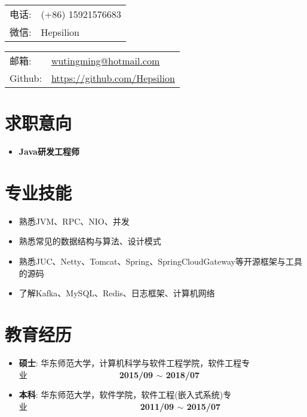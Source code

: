 \documentclass[letterpaper, UTF8, 11pt]{article}
\def\name{\textbf{\textcolor[rgb]{0.00, 0.00, 0.00}{\fontsize{30pt}{30pt}吴庭明}} ~~~~~~~~~ \fontsize{15pt}{15pt}}
\begin{document}
	
	\noindent{\bf \name} 
	\vspace{0.1in}

	\begin{minipage}{0.45\linewidth}
		\begin{tabular}{ll}
			电话:   & (+86) 15921576683 \\
			微信:   & Hepsilion \\
		\end{tabular}
	\end{minipage}
	\begin{minipage}{0.45\linewidth}
		\begin{tabular}{ll}
			邮箱:   & \href{mailto:wutingming@hotmail.com}{ wutingming@hotmail.com} \\
			Github: & \href{https://github.com/Hepsilion}{https://github.com/Hepsilion}\\
		\end{tabular}
	\end{minipage}
	\vspace{-0.1in}
	
	\section*{\textbf{求职意向}}\vspace{-0.1in}
	\begin{itemize}
		\item \textbf{Java研发工程师}
	\end{itemize}
	\vspace{-0.15in}
	
	\section*{\textbf{专业技能}}\vspace{-0.1in}
	\begin{itemize}
		\item 熟悉JVM、RPC、NIO、并发
		\item 熟悉常见的数据结构与算法、设计模式
		\item 熟悉JUC、Netty、Tomcat、Spring、SpringCloudGateway等开源框架与工具的源码
		\item 了解Kafka、MySQL、Redis、日志框架、计算机网络

	\end{itemize}
	\vspace{-0.15in}
	
	\section*{\textbf{教育经历}}\vspace{-0.1in}
	\begin{itemize}
		\item \textbf{硕士}: 华东师范大学，计算机科学与软件工程学院，软件工程专业~~~~~~~~~~~~~~~~~~~~~~\textbf{2015/09 $\sim$ 2018/07}
		\item \textbf{本科}: 华东师范大学，软件学院，软件工程(嵌入式系统)专业~~~~~~~~~~~~~~~~~~~~~~~~~~~\textbf{2011/09 $\sim$ 2015/07}
	\end{itemize}
	\vspace{-0.15in}
	
\end{document}
